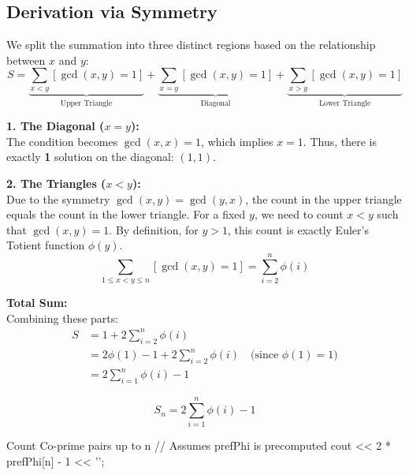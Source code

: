 \documentclass[11pt]{article}
\begin{document}
\subsection{Derivation via Symmetry}

\begin{derivation}
    We split the summation into three distinct regions based on the relationship between $x$ and $y$:
    \[ S = \underbrace{\sum_{x < y} [\gcd(x, y)=1]}_{\text{Upper Triangle}} + \underbrace{\sum_{x = y} [\gcd(x, y)=1]}_{\text{Diagonal}} + \underbrace{\sum_{x > y} [\gcd(x, y)=1]}_{\text{Lower Triangle}} \]

    \textbf{1. The Diagonal ($x = y$):} \\
    The condition becomes $\gcd(x, x) = 1$, which implies $x = 1$. Thus, there is exactly \textbf{1} solution on the diagonal: $(1, 1)$.

    \textbf{2. The Triangles ($x < y$):} \\
    Due to the symmetry $\gcd(x, y) = \gcd(y, x)$, the count in the upper triangle equals the count in the lower triangle.
    For a fixed $y$, we need to count $x < y$ such that $\gcd(x, y) = 1$. By definition, for $y > 1$, this count is exactly Euler's Totient function $\phi(y)$.
    \[ \sum_{1 \le x < y \le n} [\gcd(x, y) = 1] = \sum_{i=2}^n \phi(i) \]

    \textbf{Total Sum:} \\
    Combining these parts:
    \begin{align*}
        S & = 1 + 2 \sum_{i=2}^n \phi(i)                                                    \\
          & = 2\phi(1) - 1 + 2 \sum_{i=2}^n \phi(i) \quad \text{(since } \phi(1)=1 \text{)} \\
          & = 2 \sum_{i=1}^n \phi(i) - 1
    \end{align*}
\end{derivation}

\begin{resultbox}
    \begin{equation}
        S_n = 2 \sum_{i=1}^n \phi(i) - 1
        \label{eq:coprime_count}
    \end{equation}
\end{resultbox}

\begin{vscode}{Count Co-prime pairs up to n}
// Assumes prefPhi is precomputed
cout << 2 * prefPhi[n] - 1 << '\n';
\end{vscode}
\end{document}
